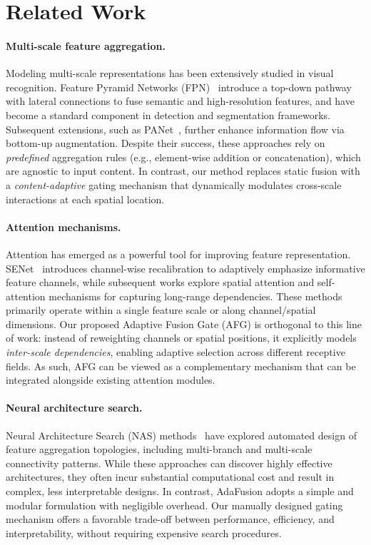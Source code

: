 \documentclass[11pt]{article}
\begin{document}
\section{Related Work}

\paragraph{Multi-scale feature aggregation.}
Modeling multi-scale representations has been extensively studied in visual recognition.
Feature Pyramid Networks (FPN)~\cite{lin2017fpn} introduce a top-down pathway with lateral
connections to fuse semantic and high-resolution features, and have become a standard
component in detection and segmentation frameworks. Subsequent extensions, such as
PANet~\cite{liu2018panet}, further enhance information flow via bottom-up augmentation.
Despite their success, these approaches rely on \emph{predefined} aggregation rules
(e.g., element-wise addition or concatenation), which are agnostic to input content.
In contrast, our method replaces static fusion with a \emph{content-adaptive} gating
mechanism that dynamically modulates cross-scale interactions at each spatial location.

\paragraph{Attention mechanisms.}
Attention has emerged as a powerful tool for improving feature representation.
SENet~\cite{hu2018senet} introduces channel-wise recalibration to adaptively emphasize
informative feature channels, while subsequent works explore spatial attention and
self-attention mechanisms for capturing long-range dependencies. These methods primarily
operate within a single feature scale or along channel/spatial dimensions. Our proposed
Adaptive Fusion Gate (AFG) is orthogonal to this line of work: instead of reweighting
channels or spatial positions, it explicitly models \emph{inter-scale dependencies},
enabling adaptive selection across different receptive fields. As such, AFG can be viewed
as a complementary mechanism that can be integrated alongside existing attention modules.

\paragraph{Neural architecture search.}
Neural Architecture Search (NAS) methods~\cite{zoph2018nas} have explored automated design
of feature aggregation topologies, including multi-branch and multi-scale connectivity
patterns. While these approaches can discover highly effective architectures, they often
incur substantial computational cost and result in complex, less interpretable designs.
In contrast, AdaFusion adopts a simple and modular formulation with negligible overhead.
Our manually designed gating mechanism offers a favorable trade-off between performance,
efficiency, and interpretability, without requiring expensive search procedures.
\end{document}
